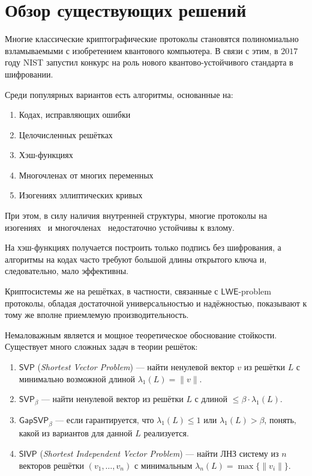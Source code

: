 \section{Обзор существующих решений}
\label{sec:Chapter3} 


Многие классические криптографические протоколы становятся полиномиально взламываемыми с изобретением квантового компьютера. В связи с этим, в $2017$ году NIST запустил конкурс на роль нового квантово-устойчивого стандарта в шифровании.

Среди популярных вариантов есть алгоритмы, основанные на:
\begin{enumerate}
	\item Кодах, исправляющих ошибки
	\item Целочисленных решётках
	\item Хэш-функциях
	\item Многочленах от многих переменных
	\item Изогениях эллиптических кривых
\end{enumerate}

При этом, в силу наличия внутренней структуры, многие протоколы на изогениях~\cite{Isogeny_hack} и многочленах~\cite{Multivar_hack} недостаточно устойчивы к взлому.

На хэш-функциях получается построить только подпись без шифрования, а алгоритмы на кодах часто требуют большой длины открытого ключа и, следовательно, мало эффективны.

Криптосистемы же на решётках, в частности, связанные с $\mathsf{LWE}$-problem протоколы, обладая достаточной универсальностью и надёжностью, показывают к тому же вполне приемлемую производительность.

Немаловажным является и мощное теоретическое обоснование стойкости. Существует много сложных задач в теории решёток:
\begin{enumerate}
	\item $\mathsf{SVP}$ ({\it Shortest Vector Problem}) --- найти ненулевой вектор $v$ из решётки $L$ с минимально возможной длиной $\lambda_1(L) = \|v\|$.
	\item $\mathsf{SVP}_\beta$ --- найти ненулевой вектор из решётки $L$ с длиной $\leq \beta\cdot\lambda_1(L)$.
	\item $\mathsf{GapSVP}_\beta$ --- если гарантируется, что $\lambda_1(L) \leq 1$ или $\lambda_1(L) > \beta$, понять, какой из вариантов для данной $L$ реализуется.
	\item $\mathsf{SIVP}$ ({\it Shortest Independent Vector Problem}) --- найти ЛНЗ систему из $n$ векторов решётки $(v_1, \ldots, v_n)$ с минимальным $\lambda_n(L) = \max\{\|v_i\|\}$.
\end{enumerate}

